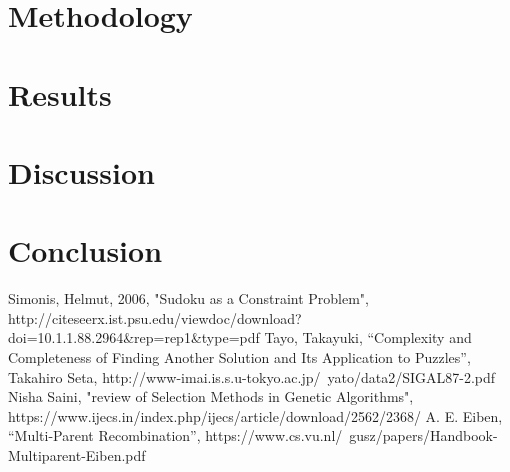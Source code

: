 \documentclass[10pt, conference]{IEEEtran}
\begin{document}
\section{Methodology}

\section{Results}

\section{Discussion}

\section{Conclusion}

\begin{thebibliography}{00}

Simonis, Helmut, 2006, "Sudoku as a Constraint Problem", http://citeseerx.ist.psu.edu/viewdoc/download?doi=10.1.1.88.2964\&rep=rep1\&type=pdf
Tayo, Takayuki, “Complexity and Completeness of Finding Another Solution and Its Application to Puzzles”, Takahiro Seta, http://www-imai.is.s.u-tokyo.ac.jp/~yato/data2/SIGAL87-2.pdf
Nisha Saini, "review of Selection Methods in Genetic Algorithms", https://www.ijecs.in/index.php/ijecs/article/download/2562/2368/
A. E. Eiben, “Multi-Parent Recombination”, https://www.cs.vu.nl/~gusz/papers/Handbook-Multiparent-Eiben.pdf

\end{thebibliography}
\end{document}
